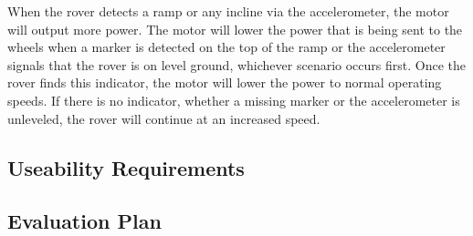When the rover detects a ramp or any incline via the accelerometer, the motor will output more power. The motor will lower the power that is being sent to the wheels when a marker is detected on the top of the ramp or the accelerometer signals that the rover is on level ground, whichever scenario occurs first. Once the rover finds this indicator, the motor will lower the power to normal operating speeds. If there is no indicator, whether a missing marker or the accelerometer is unleveled, the rover will continue at an increased speed.

\subsection*{Useability Requirements}

\subsection*{Evaluation Plan}






